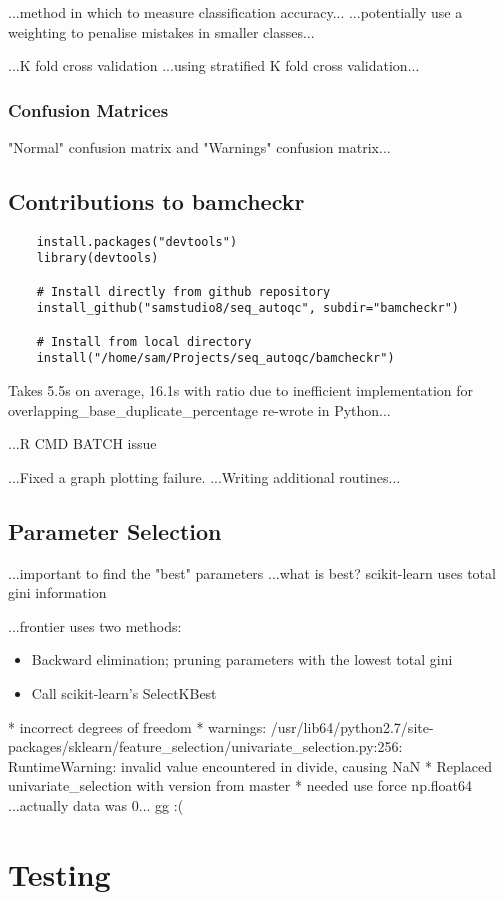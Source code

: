...method in which to measure classification accuracy...
...potentially use a weighting to penalise mistakes in smaller classes...

...K fold cross validation
...using stratified K fold cross validation...

\subsubsection{Confusion Matrices}
"Normal" confusion matrix and "Warnings" confusion matrix...

\subsection{Contributions to bamcheckr}
\begin{verbatim}
    install.packages("devtools")
    library(devtools)

    # Install directly from github repository
    install_github("samstudio8/seq_autoqc", subdir="bamcheckr")

    # Install from local directory
    install("/home/sam/Projects/seq_autoqc/bamcheckr")

\end{verbatim}
Takes 5.5s on average, 16.1s with ratio due to inefficient implementation
for overlapping\_base\_duplicate\_percentage
re-wrote in Python...


...R CMD BATCH issue

...Fixed a graph plotting failure.
...Writing additional routines...

\subsection{Parameter Selection}
...important to find the "best" parameters
...what is best? scikit-learn uses total gini information

...frontier uses two methods:
\begin{itemize}
    \item Backward elimination; pruning parameters with the lowest total gini
    \item Call scikit-learn's SelectKBest
\end{itemize}


* incorrect degrees of freedom
* warnings: /usr/lib64/python2.7/site-packages/sklearn/feature\_selection/univariate\_selection.py:256: RuntimeWarning: invalid value encountered in divide, causing NaN
* Replaced univariate\_selection with version from master
* needed use force np.float64
...actually data was 0... gg :(

\section{Testing}

